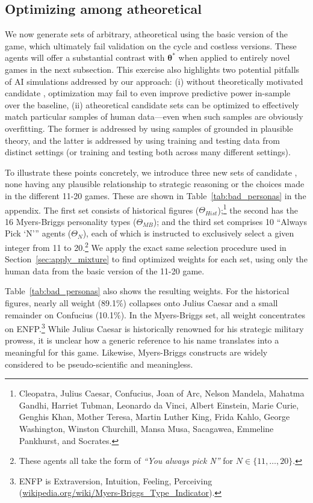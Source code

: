 \subsection{Optimizing among atheoretical }
\label{sec:arbitrary_select}

We now generate sets of arbitrary, atheoretical  using the basic version of the game, which ultimately fail validation on the cycle and costless versions.
These agents will offer a substantial contrast with $\bm{\theta}^*$ when applied to entirely novel games in the next subsection.
This exercise also highlights two potential pitfalls of AI simulations addressed by our approach: (i) without theoretically motivated candidate , optimization may fail to even improve predictive power in-sample over the baseline, (ii) atheoretical candidate sets can be optimized to effectively match particular samples of human data---even when such samples are obviously overfitting.
The former is addressed by using samples of  grounded in plausible theory, and the latter is addressed by using training and testing data from distinct settings (or training and testing both across many different settings).

To illustrate these points concretely, we introduce three new sets of candidate , none having any plausible relationship to strategic reasoning or the choices made in the different 11-20 games.
These are shown in Table~\ref{tab:bad_personas} in the appendix.
The first set consists of historical figures ($\Theta_{Hist}$);\footnote{Cleopatra, Julius Caesar, Confucius, Joan of Arc, Nelson Mandela, Mahatma Gandhi, Harriet Tubman, Leonardo da Vinci, Albert Einstein, Marie Curie, Genghis Khan, Mother Teresa, Martin Luther King, Frida Kahlo, George Washington, Winston Churchill, Mansa Musa, Sacagawea, Emmeline Pankhurst, and Socrates.} the second has the 16 Myers-Briggs personality types ($\Theta_{MB}$); and the third set comprises 10 ``Always Pick `N''' agents ($\Theta_{N}$), each of which is instructed to exclusively select a given integer from 11 to 20.\footnote{These agents all take the form of \emph{``You always pick N''} for $N \in \{11,\ldots, 20\}$.}
We apply the exact same selection procedure used in Section~\ref{sec:apply_mixture} to find optimized weights for each set, using only the human data from the basic version of the 11-20 game.

Table~\ref{tab:bad_personas} also shows the resulting weights.
For the historical figures, nearly all weight (89.1\%) collapses onto Julius Caesar and a small remainder on Confucius (10.1\%).
In the Myers-Briggs set, all weight concentrates on ENFP.\footnote{ENFP is Extraversion, Intuition, Feeling, Perceiving (\url{wikipedia.org/wiki/Myers-Briggs_Type_Indicator}).} 
While Julius Caesar is historically renowned for his strategic military prowess, it is unclear how a generic reference to his name translates into a meaningful \persona{} for this game. 
Likewise, Myers-Briggs constructs are widely considered to be pseudo-scientific and meaningless.

